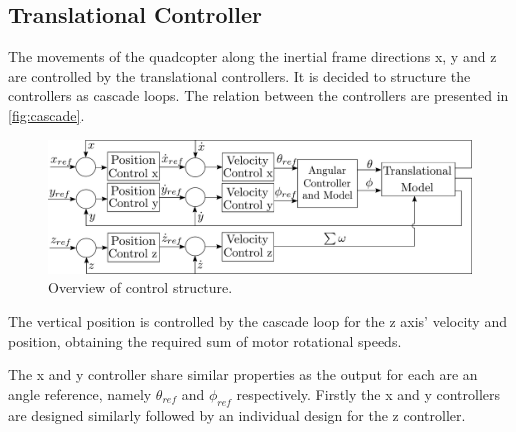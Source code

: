 \subsection{Translational Controller}
The movements of the quadcopter along the inertial frame directions x, y and z are controlled by the translational controllers. It is decided to structure the controllers as cascade loops. The relation between the controllers are presented in \autoref{fig:cascade}.


\begin{figure}[H]
	\centering
	\includegraphics[scale=0.17]{figures/TranslationalControlDiagram.pdf}
	\caption{Overview of control structure.}
	\label{fig:cascade}
\end{figure}
The vertical position is controlled by the cascade loop for the z axis' velocity and position, obtaining the required sum of motor rotational speeds. 

The x and y controller share similar properties as the output for each are an angle reference, namely $\theta_{ref}$ and $\phi_{ref}$ respectively.
Firstly the x and y controllers are designed similarly followed by an individual design for the z controller.

